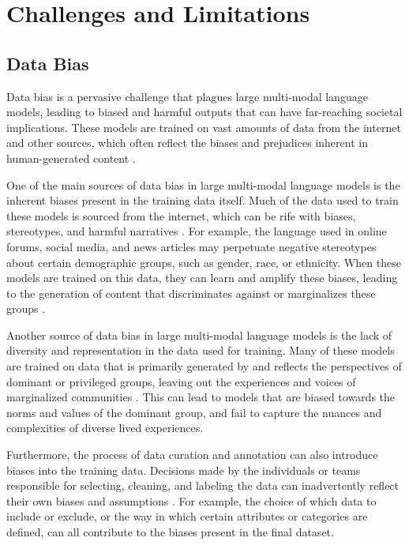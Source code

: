 \documentclass[11pt]{article}
\begin{document}
\section{Challenges and Limitations}

\subsection{Data Bias}

Data bias is a pervasive challenge that plagues large multi-modal language models, leading to biased and harmful outputs that can have far-reaching societal implications. These models are trained on vast amounts of data from the internet and other sources, which often reflect the biases and prejudices inherent in human-generated content \cite{ref100}.

One of the main sources of data bias in large multi-modal language models is the inherent biases present in the training data itself. Much of the data used to train these models is sourced from the internet, which can be rife with biases, stereotypes, and harmful narratives \cite{ref306}. For example, the language used in online forums, social media, and news articles may perpetuate negative stereotypes about certain demographic groups, such as gender, race, or ethnicity. When these models are trained on this data, they can learn and amplify these biases, leading to the generation of content that discriminates against or marginalizes these groups \cite{ref320}.

Another source of data bias in large multi-modal language models is the lack of diversity and representation in the data used for training. Many of these models are trained on data that is primarily generated by and reflects the perspectives of dominant or privileged groups, leaving out the experiences and voices of marginalized communities \cite{ref321}. This can lead to models that are biased towards the norms and values of the dominant group, and fail to capture the nuances and complexities of diverse lived experiences.

Furthermore, the process of data curation and annotation can also introduce biases into the training data. Decisions made by the individuals or teams responsible for selecting, cleaning, and labeling the data can inadvertently reflect their own biases and assumptions \cite{ref322}. For example, the choice of which data to include or exclude, or the way in which certain attributes or categories are defined, can all contribute to the biases present in the final dataset.
\end{document}
